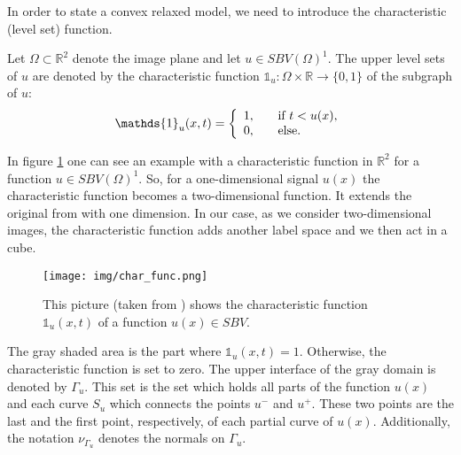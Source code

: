     In order to state a convex relaxed model, we need to introduce the characteristic (level set) function.

    \begin{definition}
    \label{def:characteristic_function}
        Let $\Omega \subset \mathbb{R}^{2}$ denote the image plane and let $u \in SBV(\Omega)^{1}$. The upper level sets of $u$ are denoted by the characteristic function $\mathds{1}_{u}: \Omega \times \mathbb{R} \longrightarrow \{ 0, 1 \}$ of the subgraph of $u$:
            \begin{equation}
                \mathds{1}_{u}(x, t) =
                    \left\{
                        \begin{array}{l l}
                            1, & \quad \text{if $t < u(x)$}, \\
                            0, & \quad \text{else}.
                        \end{array}
                    \right.
            \label{eq:characteristic_function}
            \end{equation}
    \end{definition}

    In figure \ref{fig:characteristic_function} one can see an example with a characteristic function in $\mathbb{R}^{2}$ for a function $u \in SBV(\Omega)^{1}$. So, for a one-dimensional signal $u(x)$ the characteristic function becomes a two-dimensional function. It extends the original from with one dimension. In our case, as we consider two-dimensional images, the characteristic function adds another label space and we then act in a cube.

    \begin{figure}[ht]
        \centering
        \texttt{[image: img/char\_func.png]}
        \caption[Characteristic Function of a SBV function]{\label{fig:characteristic_function} This picture (taken from \cite{Pock-et-al-iccv09}) shows the characteristic function $\mathds{1}_{u}(x, t)$ of a function $u(x) \in SBV$.}
    \end{figure}

    The gray shaded area is the part where $\mathds{1}_{u}(x, t) = 1$. Otherwise, the characteristic function is set to zero. The upper interface of the gray domain is denoted by $\Gamma_{u}$. This set is the set which holds all parts of the function $u(x)$ and each curve $S_{u}$ which connects the points $u^{-}$ and $u^{+}$. These two points are the last and the first point, respectively, of each partial curve of $u(x)$. Additionally, the notation $\nu_{\Gamma_{u}}$ denotes the normals on $\Gamma_{u}$.

